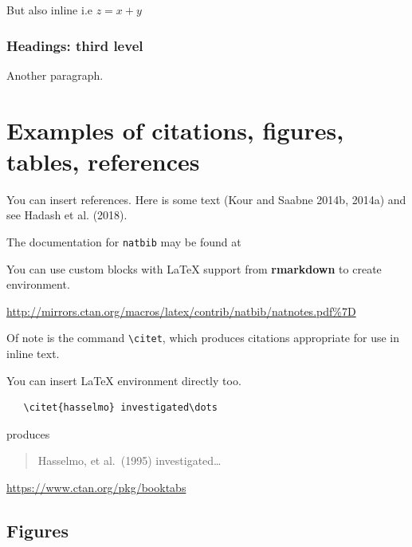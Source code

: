\documentclass{article}
\begin{document}
But also inline i.e \(z=x+y\)

\hypertarget{headings-third-level}{%
\subsubsection{Headings: third level}\label{headings-third-level}}

Another paragraph.

\hypertarget{examples-of-citations-figures-tables-references}{%
\section{Examples of citations, figures, tables,
references}\label{examples-of-citations-figures-tables-references}}

\label{sec:others}

You can insert references. Here is some text (Kour and Saabne 2014b,
2014a) and see Hadash et al. (2018).

The documentation for \verb+natbib+ may be found at

You can use custom blocks with LaTeX support from \textbf{rmarkdown} to
create environment.

\begin{center}
\url{http://mirrors.ctan.org/macros/latex/contrib/natbib/natnotes.pdf\%7D}

\end{center}

Of note is the command \verb+\citet+, which produces citations
appropriate for use in inline text.

You can insert LaTeX environment directly too.

\begin{verbatim}
   \citet{hasselmo} investigated\dots
\end{verbatim}

produces

\begin{quote}
  Hasselmo, et al.\ (1995) investigated\dots
\end{quote}

\begin{center}
  \url{https://www.ctan.org/pkg/booktabs}
\end{center}

\hypertarget{figures}{%
\subsection{Figures}\label{figures}}
\end{document}
